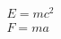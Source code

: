 \documentclass{article}
\begin{document}
$$
\begin{array}{c}
E=mc^2 \\
F=ma
\end{array}
$$
\end{document}
